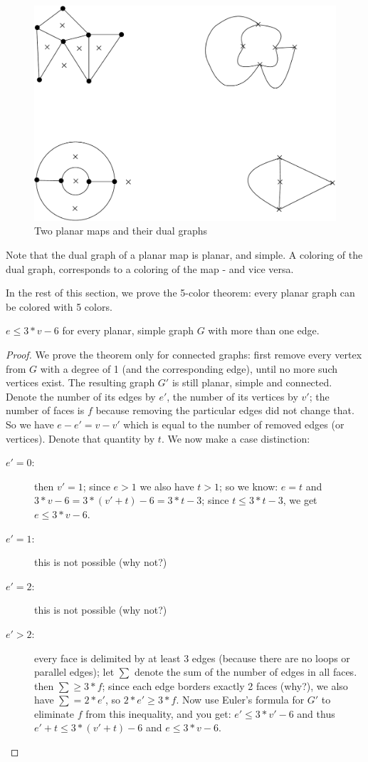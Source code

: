 \begin{figure}[ht]
\begin{center}
\includegraphics[width=0.6\linewidth,keepaspectratio]{dual1}
\end{center}
\caption{Two planar maps and their dual graphs\label{dual1}}
\end{figure}

Note that the dual graph of a planar map is planar, and simple. A
coloring of the dual graph, corresponds to a coloring of the map - and
vice versa.

In the rest of this section, we prove the 5-color theorem: every
planar graph can be colored with 5 colors.

 \begin{theorem} $e \leq 3*v-6$ for every planar, simple graph
     $G$ with more than one edge.\label{euler}
\end{theorem}
\begin{proof}
We prove the theorem only for connected graphs: first remove
every vertex from $G$ with a degree of 1 (and the corresponding edge),
until no more such vertices exist. The resulting graph $G'$ is still
planar, simple and connected. Denote the number of its edges by $e'$,
the number of its vertices by $v'$; the number of faces is $f$
because removing the particular edges did not change that. So we have
$e-e'=v-v'$ which is equal to the number of removed edges (or
vertices). Denote that quantity by $t$. We now make a case distinction:
\begin{description}
\item[\underline{$e'=0$}:]
then $v' = 1$; since $e > 1$ we also have $t > 1$;
so we know: $e = t$ and $3*v-6 = 3*(v'+t) -6 = 3*t-3$; since $t \leq
3*t-3$, we get $e \leq 3*v-6$.

\item[\underline{$e'=1$}:]
this is not possible (why not?)
\item[\underline{$e'=2$}:]
this is not possible (why not?)

\item[\underline{$e' > 2$}:]
every face is delimited by at least 3 edges (because
there are no loops or parallel edges); let $\sum$ denote the sum of
the number of edges in all faces. then $\sum \geq 3*f$; since each
edge borders exactly 2 faces (why?), we also have $\sum = 2*e'$, so
$2*e' \geq 3*f$. Now use Euler's formula for $G'$ to eliminate $f$
from this inequality, and you get: $e' \leq 3*v'-6$ and thus $e'+t
\leq 3*(v'+t)-6$ and $e \leq 3*v-6$.
\end{description}
\end{proof}

